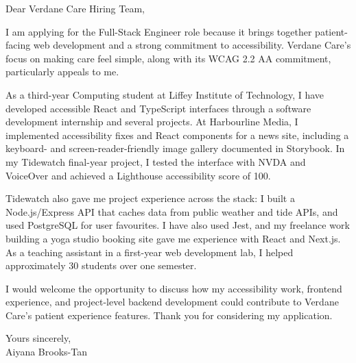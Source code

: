 \documentclass[11pt,a4paper]{article}
\begin{document}
Dear Verdane Care Hiring Team,

I am applying for the Full-Stack Engineer role because it brings together patient-facing web development and a strong commitment to accessibility. Verdane Care’s focus on making care feel simple, along with its WCAG 2.2 AA commitment, particularly appeals to me.

As a third-year Computing student at Liffey Institute of Technology, I have developed accessible React and TypeScript interfaces through a software development internship and several projects. At Harbourline Media, I implemented accessibility fixes and React components for a news site, including a keyboard- and screen-reader-friendly image gallery documented in Storybook. In my Tidewatch final-year project, I tested the interface with NVDA and VoiceOver and achieved a Lighthouse accessibility score of 100.

Tidewatch also gave me project experience across the stack: I built a Node.js/Express API that caches data from public weather and tide APIs, and used PostgreSQL for user favourites. I have also used Jest, and my freelance work building a yoga studio booking site gave me experience with React and Next.js. As a teaching assistant in a first-year web development lab, I helped approximately 30 students over one semester.

I would welcome the opportunity to discuss how my accessibility work, frontend experience, and project-level backend development could contribute to Verdane Care’s patient experience features. Thank you for considering my application.

Yours sincerely,\\
Aiyana Brooks-Tan
\end{document}
